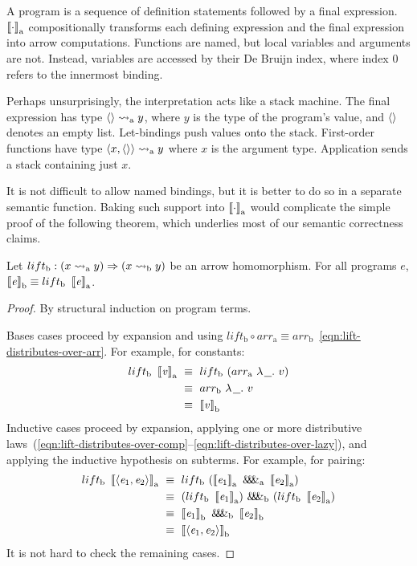 \documentclass[preprint]{sigplanconf}
\newcommand{\arrow}{\rightsquigarrow}
\newcommand{\arrowlift}{\ensuremath{lift}}
\newcommand{\arrowarr}{\ensuremath{arr}}
\newcommand{\arrowpair}{\ensuremath{\mathit{\&\mspace{-7.5mu}\&\mspace{-7.5mu}\&}}}
\newcommand{\gen}{_\mathrm{a}}
\newcommand{\genb}{_\mathrm{b}}
\begin{document}
A program is a sequence of definition statements followed by a final expression.
$\meaningof{\cdot}\gen$ compositionally transforms each defining expression and the final expression into arrow computations.
Functions are named, but local variables and arguments are not.
Instead, variables are accessed by their De Bruijn index, where index $0$ refers to the innermost binding.

Perhaps unsurprisingly, the interpretation acts like a stack machine.
The final expression has type $\pair{} \arrow\gen y$, where $y$ is the type of the program's value, and $\langle{}\rangle$ denotes an empty list.
Let-bindings push values onto the stack.
First-order functions have type $\pair{x,\pair{}} \arrow\gen y$ where $x$ is the argument type.
Application sends a stack containing just $x$.

It is not difficult to allow named bindings, but it is better to do so in a separate semantic function.
Baking such support into $\meaningof{\cdot}\gen$ would complicate the simple proof of the following theorem, which underlies most of our semantic correctness claims.

\begin{theorem}
Let $\arrowlift\genb : (x \arrow\gen y) \tto (x \arrow\genb y)$ be an arrow homomorphism.
For all programs $\mathit{e}$, $\meaningof{\mathit{e}}\genb \equiv \arrowlift\genb~\meaningof{\mathit{e}}\gen$.
\label{thm:homomorphism-implies-correct}
\end{theorem}
\begin{proof}
By structural induction on program terms.

Bases cases proceed by expansion and using $\arrowlift\genb \circ \arrowarr\gen \equiv \arrowarr\genb$~\eqref{eqn:lift-distributes-over-arr}. For example, for constants:
\begin{align*}
	\arrowlift\genb~\meaningof{\mathit{v}}\gen
		&\ \equiv\ \arrowlift\genb~(\arrowarr\gen~\fun{\underline{\ \ }}{v}) \\
		&\ \equiv\ \arrowarr\genb~\fun{\underline{\ \ }}{v} \\
		&\ \equiv\ \meaningof{\mathit{v}}\genb
\end{align*}
Inductive cases proceed by expansion, applying one or more distributive laws~(\ref{eqn:lift-distributes-over-comp}--\ref{eqn:lift-distributes-over-lazy}), and applying the inductive hypothesis on subterms.
For example, for pairing:
\begin{align*}
	\arrowlift\genb~\meaningof{\pair{\mathit{e}_1,\mathit{e}_2}}\gen
		&\ \equiv\ \arrowlift\genb~(\meaningof{\mathit{e}_1}\gen~\arrowpair\gen~\meaningof{\mathit{e}_2}\gen) \\
		&\ \equiv\ (\arrowlift\genb~\meaningof{\mathit{e}_1}\gen)~\arrowpair\genb~(\arrowlift\genb~\meaningof{\mathit{e}_2}\gen) \\
		&\ \equiv\ \meaningof{\mathit{e}_1}\genb~\arrowpair\genb~\meaningof{\mathit{e}_2}\genb \\
		&\ \equiv\ \meaningof{\pair{\mathit{e}_1,\mathit{e}_2}}\genb
\end{align*}
It is not hard to check the remaining cases.
\end{proof}
\end{document}
